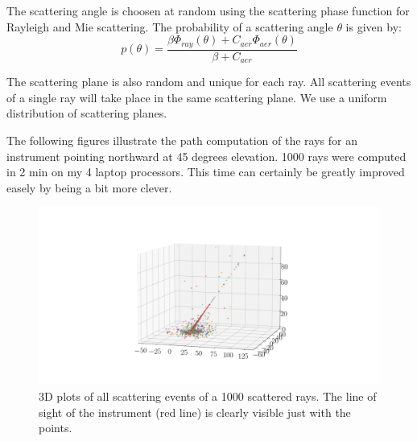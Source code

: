 \documentclass{article}
\begin{document}
The scattering angle is choosen at random using the scattering phase function for Rayleigh and Mie scattering.
The probability of a scattering angle $\theta$ is given by:
\begin{equation}
  p(\theta) = \frac{\beta \Phi_{ray}(\theta) + C_{aer} \Phi_{aer}(\theta)}{\beta + C_{aer}}
\end{equation}

The scattering plane is also random and unique for each ray. All scattering events of a single ray will take place in the same scattering plane. We use a uniform distribution of scattering planes.

The following figures illustrate the path computation of the rays for an instrument pointing northward at 45 degrees elevation. 1000 rays were computed in 2 min on my 4 laptop processors. This time can certainly be greatly improved easely by being a bit more clever.

\begin{figure}
  \includegraphics[width=\textwidth]{MS_3D_events.png}
  \caption{3D plots of all scattering events of a 1000 scattered rays. The line of sight of the instrument (red line) is clearly visible just with the points.}
\end{figure}
\end{document}
